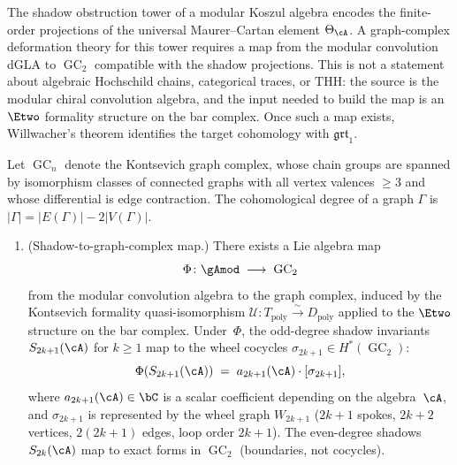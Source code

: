 
The shadow obstruction tower of a modular Koszul algebra encodes the
finite-order projections of the universal Maurer--Cartan element
$\Theta_\cA$. A graph-complex deformation theory for this tower
requires a map from the modular convolution dGLA to
$\operatorname{GC}_2$ compatible with the shadow projections. This is
not a statement about algebraic Hochschild chains, categorical traces,
or $\mathrm{THH}$: the source is the modular chiral convolution
algebra, and the input needed to build the map is an $\Etwo$ formality
structure on the bar complex. Once such a map exists, Willwacher's
theorem identifies the target cohomology with
$\mathfrak{grt}_1$.
\begin{conjecture}
\label{conj:graph-complex-shadow}
Let $\operatorname{GC}_n$ denote the Kontsevich graph complex, whose
chain groups are spanned by isomorphism classes of connected
graphs with all vertex valences $\geq 3$ and whose differential
is edge contraction. The cohomological degree of a graph
$\Gamma$ is $|\Gamma| = |E(\Gamma)| - 2|V(\Gamma)|$.
\begin{enumerate}[label=\textup{(\roman*)}]
\item \textup{(Shadow-to-graph-complex map.)}
 There exists a Lie algebra map
 \[
 \Phi \colon
 \gAmod \;\longrightarrow\;
 \operatorname{GC}_2
 \]
 from the modular convolution algebra to the graph complex,
 induced by the Kontsevich formality quasi-isomorphism
 $\mathcal{U} \colon T_{\mathrm{poly}} \xrightarrow{\sim}
 D_{\mathrm{poly}}$ applied to the $\Etwo$ structure on the bar
 complex. Under~$\Phi$, the odd-degree shadow
 invariants $S_{2k+1}(\cA)$ for $k \geq 1$ map to the
 wheel cocycles $\sigma_{2k+1} \in H^*(\operatorname{GC}_2)$:
 \[
 \Phi(S_{2k+1}(\cA))
 \;=\;
 a_{2k+1}(\cA) \cdot [\sigma_{2k+1}],
 \]
 where $a_{2k+1}(\cA) \in \bC$ is a scalar coefficient
 depending on the algebra~$\cA$, and $\sigma_{2k+1}$ is
 represented by the wheel graph $W_{2k+1}$
 \textup{(}$2k+1$ spokes, $2k+2$ vertices, $2(2k+1)$ edges,
 loop order $2k+1$\textup{)}.
 The even-degree shadows $S_{2k}(\cA)$ map to exact forms
 in $\operatorname{GC}_2$ \textup{(}boundaries, not
 cocycles\textup{)}.


\end{enumerate}
\end{conjecture}
